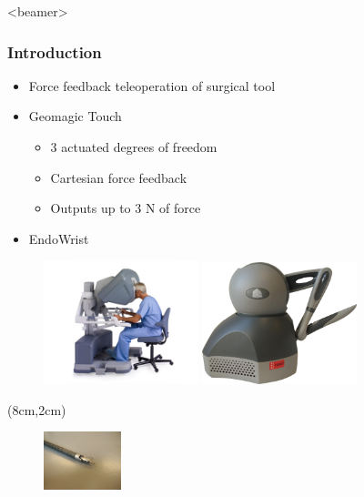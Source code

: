\begin{frame}<beamer>
\frametitle{Introduction}
\begin{itemize}
\item Force feedback teleoperation of surgical tool
\item Geomagic Touch 
\begin{itemize}
\item 3 actuated degrees of freedom 
\item Cartesian force feedback
\item Outputs up to 3 N of force
\end{itemize}
\item EndoWrist
\end{itemize}

\begin{figure}
	\includegraphics[width=0.4\textwidth]{Billeder/Dan/console.jpg}
	\resizebox{0.1\textwidth}{0.05\textwidth}{$\Rightarrow $}
	\includegraphics[width=0.4\textwidth]{Billeder/GT.png}
\end{figure}

\begin{textblock*}{0.7\textwidth}(8cm,2cm) %
	\begin{figure}[H]
		\centering
		\centering
		\includegraphics[width=0.2\textwidth]{Billeder/Endowrist3}
	\end{figure}
\end{textblock*}


\end{frame}

